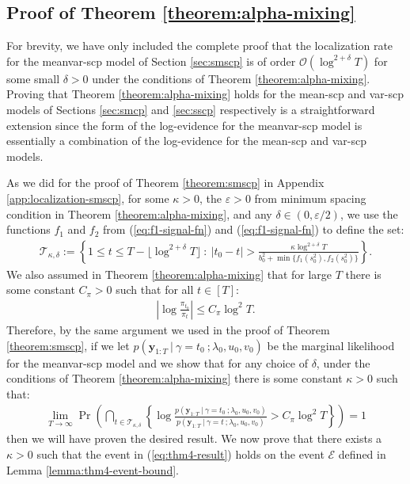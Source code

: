 \subsection{Proof of Theorem \ref{theorem:alpha-mixing}}
\label{app:alpha-mixing}

For brevity, we have only included the complete proof that the localization rate for the meanvar-scp model of Section \ref{sec:smscp} is of order $\mathcal{O}(\log^{2+\delta}T)$ for some small $\delta > 0$ under the conditions of Theorem \ref{theorem:alpha-mixing}. Proving that Theorem \ref{theorem:alpha-mixing} holds for the mean-scp and var-scp models of Sections \ref{sec:smcp} and \ref{sec:sscp} respectively is a straightforward extension since the form of the log-evidence for the meanvar-scp model is essentially a combination of the log-evidence for the mean-scp and var-scp models. 

As we did for the proof of Theorem \ref{theorem:smscp} in Appendix \ref{app:localization-smscp}, for some $\kappa > 0$, the $\varepsilon>0$ from minimum spacing condition in Theorem \ref{theorem:alpha-mixing}, and any $\delta \in (0,\varepsilon/2)$, we use the functions $f_1$ and $f_2$ from (\ref{eq:f1-signal-fn}) and (\ref{eq:f1-signal-fn}) to define the set:
\begin{align*}
    \mathcal{T}_{\kappa,\delta}:= \left\{1\leq t \leq T - \lfloor \log^{2 + \delta} T \rfloor\::\: |t_0 - t| > \frac{\kappa\log^{2 + \delta} T}{b^2_0 + \min\{f_1(s_0^2),f_2(s_0^2)\}} \right\}.
\end{align*}
We also assumed in Theorem \ref{theorem:alpha-mixing} that for large $T$ there is some constant $C_\pi > 0$ such that for all $t \in [T]$: 
\begin{align}
    \left|\log \frac{\pi_{t_0}}{\pi_t}\right| \leq C_\pi \log^2 T.
\end{align}
Therefore, by the same argument we used in the proof of Theorem \ref{theorem:smscp}, if we let $p(\mathbf{y}_{1:T} \:|\:\gamma = t_0 \:; \lambda_0, u_0, v_0)$ be the marginal likelihood for the meanvar-scp model and we show that for any choice of $\delta$, under the conditions of Theorem \ref{theorem:alpha-mixing} there is some constant $\kappa > 0$ such that:
\begin{align}
    \lim_{T\to\infty}\Pr\left(\bigcap_{t\in\mathcal{T}_{\kappa,\delta}}\left\{ \log \frac{p(\mathbf{y}_{1:T} \:|\:\gamma = t_0 \:; \lambda_0, u_0, v_0)}{p(\mathbf{y}_{1:T} \:|\:\gamma = t \:; \lambda_0, u_0, v_0)} > C_\pi \log^2 T\right\}\right) = 1 \label{eq:thm4-result}
\end{align}
then we will have proven the desired result.  We now prove that there exists a $\kappa > 0$ such that the event in (\ref{eq:thm4-result}) holds on the event $\mathcal{E}$ defined in Lemma \ref{lemma:thm4-event-bound}.

